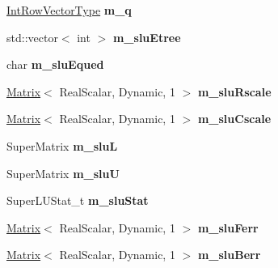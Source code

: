 \begin{DoxyCompactItemize}
\mbox{\hyperlink{class_eigen_1_1_matrix}{Int\+Row\+Vector\+Type}} {\bfseries m\+\_\+q}
\item 
\mbox{\label{class_eigen_1_1_super_l_u_a5ebc39b9c4c969efff863d9b005c9a42}} 
std\+::vector$<$ int $>$ {\bfseries m\+\_\+slu\+Etree}
\item 
\mbox{\label{class_eigen_1_1_super_l_u_ac9f41f87509d4599167d8d3d2f05db55}} 
char {\bfseries m\+\_\+slu\+Equed}
\item 
\mbox{\label{class_eigen_1_1_super_l_u_a36f0ab9882904327f24862e7187f90a6}} 
\mbox{\hyperlink{class_eigen_1_1_matrix}{Matrix}}$<$ Real\+Scalar, Dynamic, 1 $>$ {\bfseries m\+\_\+slu\+Rscale}
\item 
\mbox{\label{class_eigen_1_1_super_l_u_a98203e37b88996935ac3ed1217a5db2e}} 
\mbox{\hyperlink{class_eigen_1_1_matrix}{Matrix}}$<$ Real\+Scalar, Dynamic, 1 $>$ {\bfseries m\+\_\+slu\+Cscale}
\item 
\mbox{\label{class_eigen_1_1_super_l_u_ab7361c168905243e3038172586bc0088}} 
Super\+Matrix {\bfseries m\+\_\+sluL}
\item 
\mbox{\label{class_eigen_1_1_super_l_u_ac80db53c359175bc71130c1cabcc159e}} 
Super\+Matrix {\bfseries m\+\_\+sluU}
\item 
\mbox{\label{class_eigen_1_1_super_l_u_a7e35604c8bf4820bf9a6a38ce15d3d13}} 
Super\+L\+U\+Stat\+\_\+t {\bfseries m\+\_\+slu\+Stat}
\item 
\mbox{\label{class_eigen_1_1_super_l_u_a59db593ddc2856456da9f442e1796409}} 
\mbox{\hyperlink{class_eigen_1_1_matrix}{Matrix}}$<$ Real\+Scalar, Dynamic, 1 $>$ {\bfseries m\+\_\+slu\+Ferr}
\item 
\mbox{\label{class_eigen_1_1_super_l_u_a9ad037501031471560abbfbe69954e16}} 
\mbox{\hyperlink{class_eigen_1_1_matrix}{Matrix}}$<$ Real\+Scalar, Dynamic, 1 $>$ {\bfseries m\+\_\+slu\+Berr}
\item 
\mbox{\label{class_eigen_1_1_super_l_u_ad71f9846087b4a703731eb5cb4ca874b}} 

\end{DoxyCompactItemize}
